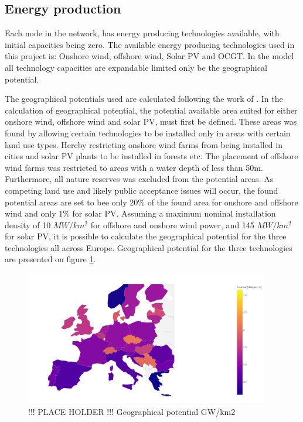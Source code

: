 \subsection{Energy production}

Each node in the network, has energy producing technologies available, with initial capacities being zero. The available energy producing technologies used in this project is: Onshore wind, offshore wind, Solar PV and OCGT. In the model all technology capacities are expandable limited only be the geographical potential. 

The geographical potentials used are calculated following the work of  \cite{PyPSA_euro_30_model}. In the calculation of geographical potential, the potential available area suited for either onshore wind, offshore wind and solar PV, must first be defined. These areas was found by allowing certain technologies to be installed only in areas with certain land use types. Hereby restricting onshore wind farms from being installed in cities and solar PV plants to be installed in forests etc. The placement of offshore wind farms was restricted to areas with a water depth of less than 50m. Furthermore, all nature reserves was excluded from the potential areas. As competing land use and likely public acceptance issues will occur, the found potential areas are set to bee only 20\% of the found area for onshore and offshore wind and only 1\% for solar PV. 
Assuming a maximum nominal installation density of 10 $MW/km^2$ for offshore and onshore wind power, and 145 $MW/km^2$ for solar PV, it is possible to calculate the geographical potential for the three technologies all across Europe. Geographical potential for the three technologies are presented on figure \ref{fig:geographical_potential}.

\begin{figure}[H]\centering
	\includegraphics[width=0.95\textwidth]{./Images/geographical_potential}
	\caption{!!! PLACE HOLDER !!! Geographical potential GW/km2}
	\label{fig:geographical_potential}
\end{figure}


